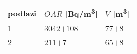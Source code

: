 \begin{tabular}{lll}
\toprule
podlazi & $OAR$ [\si{Bq/m^3}] & $V$ [\si{m^3}] \\
\midrule
1 &          3042$\pm$108 &         77$\pm$8 \\
2 &             211$\pm$7 &         65$\pm$8 \\
\bottomrule
\end{tabular}
